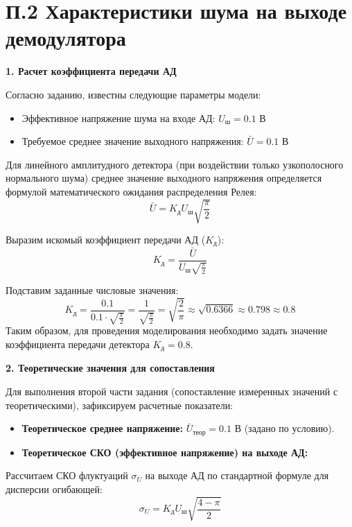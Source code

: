 \section{П.2 Характеристики шума на выходе демодулятора}

\vspace{1em}
\textbf{1. Расчет коэффициента передачи АД}

Согласно заданию, известны следующие параметры модели:
\begin{itemize}
    \item Эффективное напряжение шума на входе АД: $U_{\text{ш}} = 0.1 \text{ В}$
    \item Требуемое среднее значение выходного напряжения: $\bar{U} = 0.1 \text{ В}$
\end{itemize}

Для линейного амплитудного детектора (при воздействии только узкополосного нормального шума) среднее значение выходного напряжения определяется формулой математического ожидания распределения Релея:
\begin{equation*}
    \bar{U} = K_{\text{д}} U_{\text{ш}} \sqrt{\frac{\pi}{2}}
\end{equation*}

Выразим искомый коэффициент передачи АД ($K_{\text{д}}$):
\begin{equation*}
    K_{\text{д}} = \frac{\bar{U}}{U_{\text{ш}} \sqrt{\frac{\pi}{2}}}
\end{equation*}

Подставим заданные числовые значения:
\begin{equation*}
    K_{\text{д}} = \frac{0.1}{0.1 \cdot \sqrt{\frac{\pi}{2}}} = \frac{1}{\sqrt{\frac{\pi}{2}}} = \sqrt{\frac{2}{\pi}} \approx \sqrt{0.6366} \approx 0.798 \approx 0.8
\end{equation*}
Таким образом, для проведения моделирования необходимо задать значение коэффициента передачи детектора $K_{\text{д}} = 0.8$.

\vspace{1em}
\textbf{2. Теоретические значения для сопоставления}

Для выполнения второй части задания (сопоставление измеренных значений с теоретическими), зафиксируем расчетные показатели:
\begin{itemize}
    \item \textbf{Теоретическое среднее напряжение:} $\bar{U}_{\text{теор}} = 0.1 \text{ В}$ (задано по условию).
    \item \textbf{Теоретическое СКО (эффективное напряжение) на выходе АД:}
\end{itemize}
Рассчитаем СКО флуктуаций $\sigma_U$ на выходе АД по стандартной формуле для дисперсии огибающей:
\begin{equation*}
    \sigma_U = K_{\text{д}} U_{\text{ш}} \sqrt{\frac{4 - \pi}{2}}
\end{equation*}

